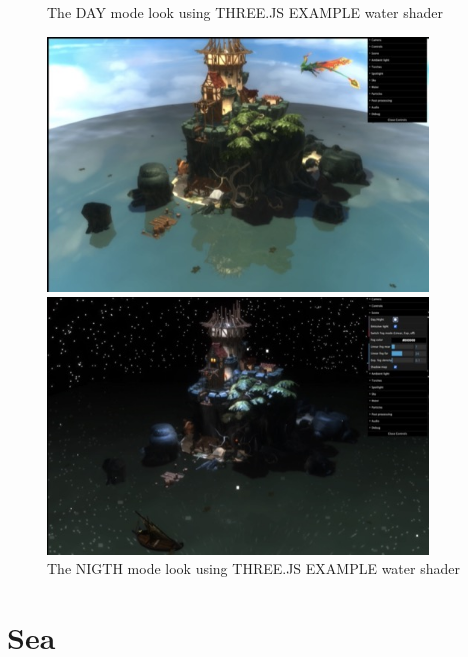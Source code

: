 \documentclass[10pt,a4paper]{article}
\begin{document}
\begin{figure}[H]
\centering
\caption{The DAY mode look using THREE.JS EXAMPLE water shader}
\includegraphics[width=0.9\textwidth,keepaspectratio]{day}
\caption{The NIGTH mode look using THREE.JS EXAMPLE water shader}
\includegraphics[width=0.9\textwidth,keepaspectratio]{night}
\end{figure}


\section{Sea}
\end{document}
